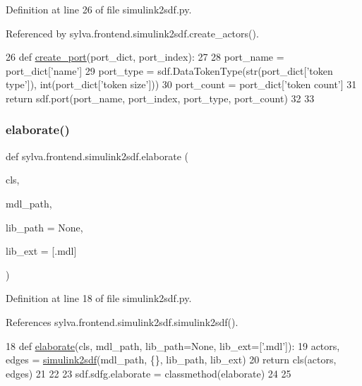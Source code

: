 Definition at line 26 of file simulink2sdf.\+py.



Referenced by sylva.\+frontend.\+simulink2sdf.\+create\+\_\+actors().


\begin{DoxyCode}
26 \textcolor{keyword}{def }\hyperlink{namespacesylva_1_1frontend_1_1simulink2sdf_a86a92182288e89b6742e5124e8c3ec38}{create\_port}(port\_dict, port\_index):
27 
28     port\_name = port\_dict[\textcolor{stringliteral}{'name'}]
29     port\_type = sdf.DataTokenType(str(port\_dict[\textcolor{stringliteral}{'token type'}]), int(port\_dict[\textcolor{stringliteral}{'token size'}]))
30     port\_count = port\_dict[\textcolor{stringliteral}{'token count'}]
31     \textcolor{keywordflow}{return} sdf.port(port\_name, port\_index, port\_type, port\_count)
32 
33 
\end{DoxyCode}
\mbox{\label{namespacesylva_1_1frontend_1_1simulink2sdf_a65e70cbcdade6118914d5c16f96ae56c}} 
\subsubsection{\texorpdfstring{elaborate()}{elaborate()}}
{\footnotesize\ttfamily def sylva.\+frontend.\+simulink2sdf.\+elaborate (\begin{DoxyParamCaption}\item[{}]{cls,  }\item[{}]{mdl\+\_\+path,  }\item[{}]{lib\+\_\+path = {\ttfamily None},  }\item[{}]{lib\+\_\+ext = {\ttfamily \mbox{[}\textquotesingle{}.mdl\textquotesingle{}\mbox{]}} }\end{DoxyParamCaption})}



Definition at line 18 of file simulink2sdf.\+py.



References sylva.\+frontend.\+simulink2sdf.\+simulink2sdf().


\begin{DoxyCode}
18 \textcolor{keyword}{def }\hyperlink{namespacesylva_1_1frontend_1_1simulink2sdf_a65e70cbcdade6118914d5c16f96ae56c}{elaborate}(cls, mdl\_path, lib\_path=None, lib\_ext=['.mdl']):
19     actors, edges = \hyperlink{namespacesylva_1_1frontend_1_1simulink2sdf_aa33a1cece85e239778cb65b5d4e62438}{simulink2sdf}(mdl\_path, \{\}, lib\_path, lib\_ext)
20     \textcolor{keywordflow}{return} cls(actors, edges)
21 
22 
23 sdf.sdfg.elaborate = classmethod(elaborate)
24 
25 
\end{DoxyCode}
\mbox{\label{namespacesylva_1_1frontend_1_1simulink2sdf_aa33a1cece85e239778cb65b5d4e62438}} 
